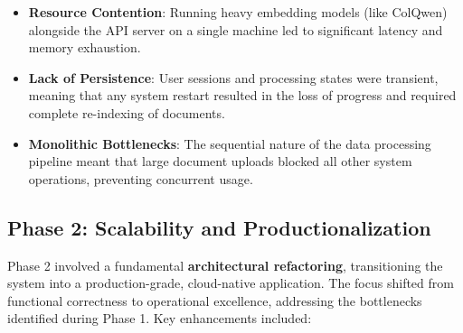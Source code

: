 \begin{itemize}
    \item \textbf{Resource Contention}: Running heavy embedding models (like ColQwen) alongside the API server on a single machine led to significant latency and memory exhaustion.
    \item \textbf{Lack of Persistence}: User sessions and processing states were transient, meaning that any system restart resulted in the loss of progress and required complete re-indexing of documents.
    \item \textbf{Monolithic Bottlenecks}: The sequential nature of the data processing pipeline meant that large document uploads blocked all other system operations, preventing concurrent usage.
\end{itemize}

\subsection{Phase 2: Scalability and Productionalization}

Phase 2 involved a fundamental \textbf{architectural refactoring}, transitioning the system into a production-grade, cloud-native application. The focus shifted from functional correctness to operational excellence, addressing the bottlenecks identified during Phase 1. Key enhancements included:

